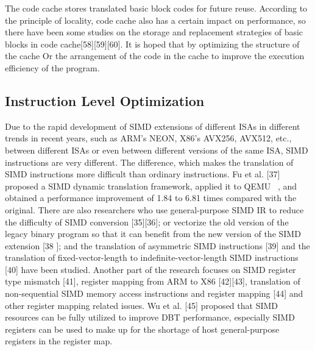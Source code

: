 The code cache stores translated basic block codes for future reuse.
According to the principle of locality, code cache also has a certain impact on performance, so there have been some studies on the storage and replacement strategies of basic blocks in code cache[58][59][60].
It is hoped that by optimizing the structure of the cache Or the arrangement of the code in the cache to improve the execution efficiency of the program.

\subsection{Instruction Level Optimization}
Due to the rapid development of SIMD extensions of different ISAs in different trends in recent years, such as ARM's NEON, X86's AVX256, AVX512, etc., between different ISAs or even between different versions of the same ISA, SIMD instructions are very different.
The difference, which makes the translation of SIMD instructions more difficult than ordinary instructions.
Fu et al. [37] proposed a SIMD dynamic translation framework, applied it to QEMU ~\cite{DBLP:conf/usenix/Bellard05}, and obtained a performance improvement of 1.84 to 6.81 times compared with the original.
There are also researchers who use general-purpose SIMD IR to reduce the difficulty of SIMD conversion [35][36]; or vectorize the old version of the legacy binary program so that it can benefit from the new version of the SIMD extension [38 ]; and the translation of asymmetric SIMD instructions [39] and the translation of fixed-vector-length to indefinite-vector-length SIMD instructions [40] have been studied.
Another part of the research focuses on SIMD register type mismatch [41], register mapping from ARM to X86 [42][43], translation of non-sequential SIMD memory access instructions and register mapping [44] and other register mapping related issues.
Wu et al. [45] proposed that SIMD resources can be fully utilized to improve DBT performance, especially SIMD registers can be used to make up for the shortage of host general-purpose registers in the register map.

